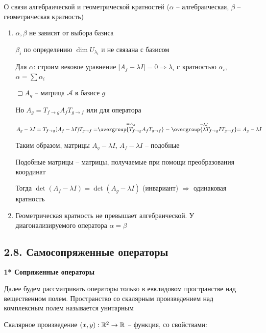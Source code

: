 \documentclass[12pt]{article}
\begin{document}
    \Nota О связи алгебраической и геометрической кратностей ($\alpha$ -- алгебраическая, $\beta$ -- геометрическая кратность)

    \begin{enumerate}
        \item $\alpha, \beta$ не зависят от выбора базиса

        \begin{MyProof}
            $\beta_i$ по определению $\dim U_{\lambda_i}$ и не связана с базисом

            Для $\alpha$: строим вековое уравнение $|A_f - \lambda I| = 0 \Longrightarrow \lambda_i$ с кратностью $\alpha_i$, $\alpha = \sum \alpha_i$

            $\sqsupset A_g$ -- матрица $\mathcal{A}$ в базисе $g$

            Но $A_g = T_{f\to g} A_f T_{g\to f}$ или для оператора

            $A_g - \lambda I = T_{f\to g} (A_f - \lambda I) T_{g\to f} =
            \stackrel{= A_g}{\overgroup{T_{f\to g} A_f T_{g\to f}}} - \stackrel{= \lambda I}{\overgroup{\lambda T_{f\to g} I T_{g\to f}}} =
            A_g - \lambda I$

            Таким образом, матрицы $A_g - \lambda I$, $A_f - \lambda I$ -- подобные

            \Def Подобные матрицы -- матрицы, получаемые при помощи преобразования координат

            Тогда $\det (A_f - \lambda I) = \det (A_g - \lambda I)$ (инвариант) $\Longrightarrow$ одинаковая кратность

        \end{MyProof}

        \item Геометрическая кратность не превышает алгебраической. У диагонализируемого оператора $\alpha = \beta$
    \end{enumerate}

    \subsection[p2\_8]{2.8. Самосопряженные операторы}

    \textbf{1* Сопряженные операторы}

    Далее будем рассматривать операторы только в евклидовом пространстве над вещественном полем.
    Пространство со скалярным произведением над комплексным полем называется унитарным

    \Mem Скалярное произведение $(x, y) : \mathbb{R}^2 \rightarrow \mathbb{R}$ -- функция, со свойствами:
\end{document}
